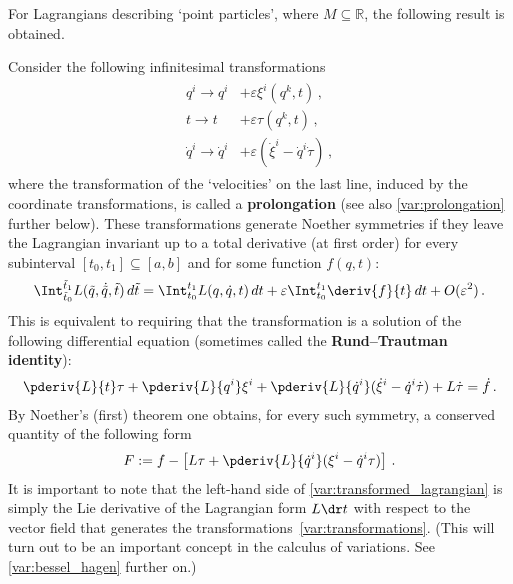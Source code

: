     For Lagrangians describing `point particles', where $M\subseteq\mathbb{R}$, the following result is obtained.
    \begin{example}
        Consider the following infinitesimal transformations
        \begin{gather}
            \begin{aligned}
                q^i\longrightarrow q^i& + \varepsilon\xi^i(q^k,t)\,,\\
                t\longrightarrow t& + \varepsilon\tau(q^k,t)\,,\label{var:transformations}\\
                \dot{q}^i\longrightarrow\dot{q}^i& + \varepsilon(\dot{\xi}^i - \dot{q}^i\dot{\tau})\,,
            \end{aligned}
        \end{gather}
        where the transformation of the `velocities' on the last line, induced by the coordinate transformations, is called a \textbf{prolongation} (see also \cref{var:prolongation} further below). These transformations generate Noether symmetries if they leave the Lagrangian invariant up to a total derivative (at first order) for every subinterval $[t_0,t_1]\subseteq[a,b]$ and for some function $f(q,t)$:
        \begin{gather}
            \Int_{\tilde{t}_0}^{\tilde{t}_1}L(\tilde{q},\dot{\tilde{q}},\tilde{t})\,d\tilde{t} = \Int_{t_0}^{t_1}L(q,\dot{q},t)\,dt + \varepsilon\Int_{t_0}^{t_1}\deriv{f}{t}\,dt + O(\varepsilon^2)\,.
        \end{gather}
        This is equivalent to requiring that the transformation is a solution of the following differential equation (sometimes called the \textbf{Rund--Trautman identity}):
        \begin{gather}
            \label{var:transformed_lagrangian}
            \pderiv{L}{t}\tau + \pderiv{L}{q^i}\xi^i + \pderiv{L}{\dot{q}^i}(\dot{\xi}^i - \dot{q}^i\dot{\tau}) + L\dot{\tau} = \dot{f}\,.
        \end{gather}
        By Noether's (first) theorem one obtains, for every such symmetry, a conserved quantity of the following form
        \begin{gather}
            F := f - \left[L\tau + \pderiv{L}{\dot{q}^i}(\xi^i - \dot{q}^i\tau)\right]\,.
        \end{gather}
        It is important to note that the left-hand side of \cref{var:transformed_lagrangian} is simply the Lie derivative of the Lagrangian form $L\dr t$ with respect to the vector field that generates the transformations~\eqref{var:transformations}. (This will turn out to be an important concept in the calculus of variations. See \cref{var:bessel_hagen} further on.)
    \end{example}

